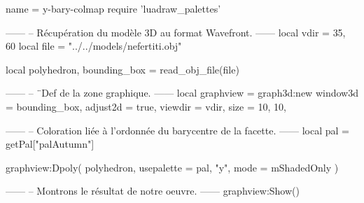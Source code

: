 \documentclass{standalone}
\begin{document}
\begin{luadraw}{name = y-bary-colmap}
require 'luadraw_palettes'

------
-- Récupération du modèle 3D au format Wavefront.
------
local vdir = {35, 60}
local file = "../../models/nefertiti.obj"

local polyhedron, bounding_box = read_obj_file(file)

------
-- ¨Def de la zone graphique.
------
local graphview = graph3d:new{
  window3d = bounding_box,
  adjust2d = true,
  viewdir  = vdir,
  size     = {10, 10},
}

------
-- Coloration liée à l'ordonnée du barycentre de la facette.
------
local pal = getPal["palAutumn"]

graphview:Dpoly(
  polyhedron,
  {
    usepalette = {pal, "y"},
    mode       = mShadedOnly
  }
)

------
-- Montrons le résultat de notre oeuvre.
------
graphview:Show()
\end{luadraw}
\end{document}
